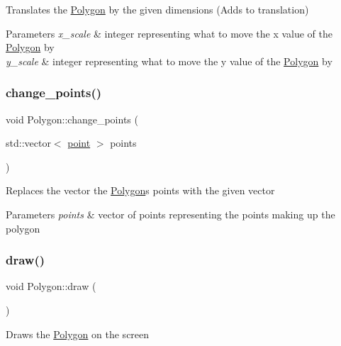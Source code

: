 Translates the \mbox{\hyperlink{class_polygon}{Polygon}} by the given dimensions (Adds to translation) 
\begin{DoxyParams}{Parameters}
{\em x\+\_\+scale} & integer representing what to move the x value of the \mbox{\hyperlink{class_polygon}{Polygon}} by \\
\hline
{\em y\+\_\+scale} & integer representing what to move the y value of the \mbox{\hyperlink{class_polygon}{Polygon}} by \\
\hline
\end{DoxyParams}
\mbox{\label{class_polygon_ab5a643b45071142291a93070f36e9159}} 
\subsubsection{\texorpdfstring{change\+\_\+points()}{change\_points()}}
{\footnotesize\ttfamily void Polygon\+::change\+\_\+points (\begin{DoxyParamCaption}\item[{std\+::vector$<$ \mbox{\hyperlink{structpoint}{point}} $>$}]{points }\end{DoxyParamCaption})}

Replaces the vector the \mbox{\hyperlink{class_polygon}{Polygon}}\textquotesingle{}s points with the given vector 
\begin{DoxyParams}{Parameters}
{\em points} & vector of points representing the points making up the polygon \\
\hline
\end{DoxyParams}
\mbox{\label{class_polygon_a17428a7d7dff4653c905b91020a9f803}} 
\subsubsection{\texorpdfstring{draw()}{draw()}}
{\footnotesize\ttfamily void Polygon\+::draw (\begin{DoxyParamCaption}{ }\end{DoxyParamCaption})}

Draws the \mbox{\hyperlink{class_polygon}{Polygon}} on the screen \mbox{\label{class_polygon_a1f9b4d001197e6ff84fb4ed50b47be59}} 
